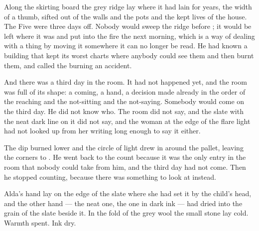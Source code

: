 Along the skirting board the grey ridge lay where it had lain for years, the width of a thumb, sifted out of the walls and the pots and the kept lives of the house. The Five were three days off. Nobody would sweep the ridge before ; it would be left where it was and put into the fire the next morning, which is a way of dealing with a thing by moving it somewhere it can no longer be read. He had known a building that kept its worst charts where anybody could see them and then burnt them, and called the burning an accident.

And there was a third day in the room. It had not happened yet, and the room was full of its shape: a coming, a hand, a decision made already in the order of the reaching and the not-sitting and the not-saying. Somebody would come on the third day. He did not know who. The room did not say, and the slate with the neat dark line on it did not say, and the woman at the edge of the flare light had not looked up from her writing long enough to say it either.

The dip burned lower and the circle of light drew in around the pallet, leaving the corners to . He went back to the count because it was the only entry in the room that nobody could take from him, and the third day had not come. Then he stopped counting, because there was something to look at instead.

Alda's hand lay on the edge of the slate where she had set it by the child's head, and the other hand --- the neat one, the one in dark ink --- had dried into the grain of the slate beside it. In the fold of the grey wool the small stone lay cold. Warmth spent. Ink dry.
